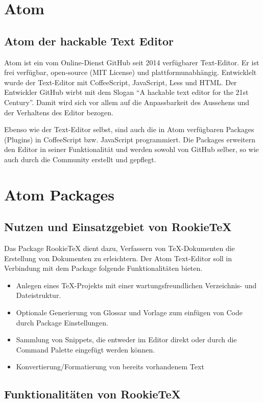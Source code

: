 \chapter{Atom}
    \section{Atom der hackable Text Editor}
    Atom ist ein vom Online-Dienst GitHub seit 2014 verfügbarer Text-Editor. Er ist frei verfügbar, open-source (MIT License) und plattformunabhängig. Entwicklelt wurde der Text-Editor mit CoffeeScript, JavaScript, Less und HTML. Der Entwickler GitHub wirbt mit dem Slogan "`A hackable text editor for the 21st Century"'. Damit wird sich vor allem auf die Anpassbarkeit des Aussehens und der Verhaltens des Editor bezogen.

    Ebenso wie der Text-Editor selbst, sind auch die in Atom verfügbaren Packages (Plugins) in CoffeeScript bzw. JavaScript programmiert. Die Packages erweitern den Editor in seiner Funktionalität und werden sowohl von GitHub selber, so wie auch durch die Community erstellt und gepflegt.

\chapter{Atom Packages}
    \section{Nutzen und Einsatzgebiet von RookieTeX}
    Das Package RookieTeX dient dazu, Verfassern von TeX-Dokumenten die Erstellung von Dokumenten zu erleichtern. Der Atom Text-Editor soll in Verbindung mit dem Package folgende Funktionalitäten bieten.

    \begin{itemize}
        \item Anlegen eines TeX-Projekts mit einer wartungsfreundlichen Verzeichnis- und Dateistruktur.
        \item Optionale Generierung von Glossar und Vorlage zum einfügen von Code durch Package Einstellungen.
        \item Sammlung von Snippets, die entweder im Editor direkt oder durch die Command Palette eingefügt werden können.
        \item Konvertierung/Formatierung von bereits vorhandenem Text
    \end{itemize}

    \section{Funktionalitäten von RookieTeX}
